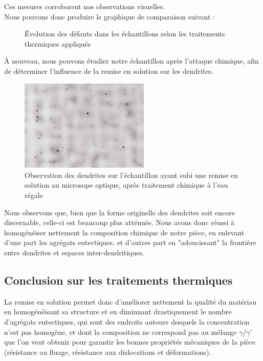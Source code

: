 Ces mesures corroborent nos observations visuelles.\\

Nous pouvons donc produire le graphique de comparaison suivant :


\begin{figure}[H]
    \centering
    
    \caption{Évolution des défauts dans les échantillons selon les traitements thermiques appliqués\\}
    \label{fig:evolution_proportion_defauts_brut_RES}
\end{figure}

À nouveau, nous pouvons étudier notre échantillon après l'attaque chimique, 
afin de déterminer l'influence de la remise en solution sur les dendrites.\\

\begin{figure}[H]
    \centering
    \includegraphics[width = 0.55\textwidth]{images_optique/res_dendrites.pdf}
    \caption{Observation des dendrites sur l'échantillon ayant subi une remise en solution
    au microsope optique, après traitement chimique à l'eau régale\\}
    \label{fig:res_dendrites_optique}
\end{figure}

Nous observons que, bien que la forme originelle des dendrites soit encore discernable, 
celle-ci est beaucoup plus atténuée. Nous avons donc réussi à homogénéiser nettement
la composition chimique de notre pièce, en enlevant d'une part les agrégats eutectiques, 
et d'autres part en "adoucissant" la frontière entre dendrites et espaces inter-dendritiques.


\subsection*{Conclusion sur les traitements thermiques}

La remise en solution permet donc d'améliorer nettement la qualité du matériau en
homogénéisant sa structure et en diminuant drastiquement le nombre d'agrégats
eutectiques, qui sont des endroits autours desquels la concentration n'est pas 
homogène, et dont la composition ne correspond pas au mélange $\gamma$/$\gamma'$
que l'on veut obtenir pour garantir les bonnes propriétés mécaniques de la pièce 
(résistance au fluage, résistance aux dislocations et déformations).



